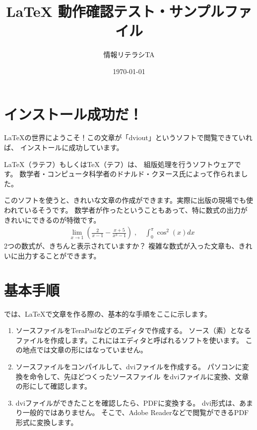\documentclass[a4paper,11pt]{jsarticle}
\title{ {\LaTeX} 動作確認テスト・サンプルファイル}
\author{情報リテラシTA}
\date{\today}
\begin{document}
\maketitle


\section{インストール成功だ！}
\LaTeX の世界にようこそ！この文章が「dviout」というソフトで閲覧できていれば、
インストールに成功しています。

\LaTeX（ラテフ）もしくは\TeX（テフ）は、
組版処理を行うソフトウェアです。
数学者・コンピュータ科学者のドナルド・クヌース氏によって作られました。

このソフトを使うと、きれいな文章の作成ができます。実際に出版の現場でも使われているそうです。
数学者が作ったということもあって、特に数式の出力がきれいにできるのが特徴です。
\begin{eqnarray}
	& \displaystyle \lim _{x \rightarrow 1} \left( \frac{2}{x-1} - \frac{x+5}{x^3 -1} \right)\; ,\;
	& \displaystyle \int ^\pi _0 \cos ^2 (x)dx \nonumber
\end{eqnarray}
2つの数式が、きちんと表示されていますか？
複雑な数式が入った文章も、きれいに出力することができます。



\section{基本手順}

では、\LaTeX で文章を作る際の、基本的な手順をここに示します。

\begin{enumerate}
	\item ソースファイルをTeraPadなどのエディタで作成する。
	      ソース（素）となるファイルを作成します。これにはエディタと呼ばれるソフトを使います。
	      この地点では文章の形にはなっていません。
	\item ソースファイルをコンパイルして、dviファイルを作成する。
	      パソコンに変換を命令して、先ほどつくったソースファイル
	      をdviファイルに変換、文章の形にして確認します。
	\item dviファイルができたことを確認したら、PDFに変換する。
	      dvi形式は、あまり一般的ではありません。
	      そこで、Adobe Readerなどで閲覧ができるPDF形式に変換します。
\end{enumerate}
\end{document}
